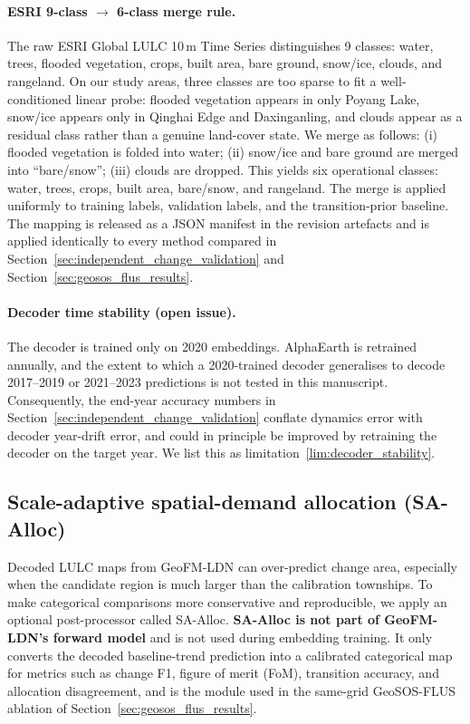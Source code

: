 \documentclass{article}
\begin{document}
\paragraph{ESRI 9-class $\to$ 6-class merge rule.} The raw ESRI Global LULC 10\,m Time Series distinguishes 9 classes: water, trees, flooded vegetation, crops, built area, bare ground, snow/ice, clouds, and rangeland. On our study areas, three classes are too sparse to fit a well-conditioned linear probe: flooded vegetation appears in only Poyang Lake, snow/ice appears only in Qinghai Edge and Daxinganling, and clouds appear as a residual class rather than a genuine land-cover state. We merge as follows: (i) flooded vegetation is folded into water; (ii) snow/ice and bare ground are merged into ``bare/snow''; (iii) clouds are dropped. This yields six operational classes: water, trees, crops, built area, bare/snow, and rangeland. The merge is applied uniformly to training labels, validation labels, and the transition-prior baseline. The mapping is released as a JSON manifest in the revision artefacts and is applied identically to every method compared in Section~\ref{sec:independent_change_validation} and Section~\ref{sec:geosos_flus_results}.

\paragraph{Decoder time stability (open issue).} The decoder is trained only on 2020 embeddings. AlphaEarth is retrained annually, and the extent to which a 2020-trained decoder generalises to decode 2017--2019 or 2021--2023 predictions is not tested in this manuscript. Consequently, the end-year accuracy numbers in Section~\ref{sec:independent_change_validation} conflate dynamics error with decoder year-drift error, and could in principle be improved by retraining the decoder on the target year. We list this as limitation~\ref{lim:decoder_stability}.

\subsection{Scale-adaptive spatial-demand allocation (SA-Alloc)}
\label{sec:scale_adaptive_allocation}

Decoded LULC maps from GeoFM-LDN can over-predict change area, especially when the candidate region is much larger than the calibration townships. To make categorical comparisons more conservative and reproducible, we apply an optional post-processor called SA-Alloc. \textbf{SA-Alloc is not part of GeoFM-LDN's forward model} and is not used during embedding training. It only converts the decoded baseline-trend prediction into a calibrated categorical map for metrics such as change F1, figure of merit (FoM), transition accuracy, and allocation disagreement, and is the module used in the same-grid GeoSOS-FLUS ablation of Section~\ref{sec:geosos_flus_results}.
\end{document}
